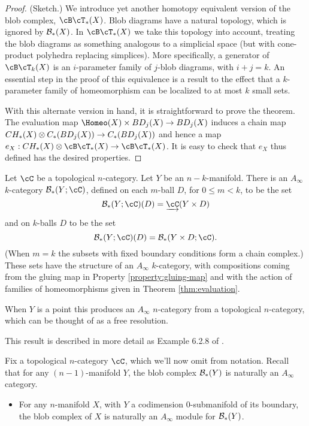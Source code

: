 \documentclass{pnastwo}
\begin{document}
\begin{article}
\begin{proof}(Sketch.)
We introduce yet another homotopy equivalent version of
the blob complex, $\cB\cT_*(X)$.
Blob diagrams have a natural topology, which is ignored by ${\mathcal B}_*(X)$.
In $\cB\cT_*(X)$ we take this topology into account, treating the blob diagrams as something
analogous to a simplicial space (but with cone-product polyhedra replacing simplices).
More specifically, a generator of $\cB\cT_k(X)$ is an $i$-parameter family of $j$-blob diagrams, with $i+j=k$. An essential step in the proof of this equivalence is a result to the effect that a $k$-parameter family of homeomorphism can be localized to at most $k$ small sets.

With this alternate version in hand, it is straightforward to prove the theorem.
The evaluation map $\Homeo(X)\times BD_j(X)\to BD_j(X)$
induces a chain map $CH_*(X)\otimes C_*(BD_j(X))\to C_*(BD_j(X))$
and hence a map $e_X: \CH{X} \tensor \cB\cT_*(X) \to \cB\cT_*(X)$.
It is easy to check that $e_X$ thus defined has the desired properties.
\end{proof}

\begin{thm}
\label{thm:blobs-ainfty}
Let $\cC$ be  a topological $n$-category.
Let $Y$ be an $n{-}k$-manifold. 
There is an $A_\infty$ $k$-category $\bc_*(Y;\cC)$, defined on each $m$-ball $D$, for $0 \leq m < k$, 
to be the set $$\bc_*(Y;\cC)(D) = \cl{\cC}(Y \times D)$$ and on $k$-balls $D$ to be the set 
$$\bc_*(Y;\cC)(D) = \bc_*(Y \times D; \cC).$$ 
(When $m=k$ the subsets with fixed boundary conditions form a chain complex.) 
These sets have the structure of an $A_\infty$ $k$-category, with compositions coming from the gluing map in 
Property \ref{property:gluing-map} and with the action of families of homeomorphisms given in Theorem \ref{thm:evaluation}.
\end{thm}
\begin{rem}
When $Y$ is a point this produces an $A_\infty$ $n$-category from a topological $n$-category, 
which can be thought of as a free resolution.
\end{rem}
This result is described in more detail as Example 6.2.8 of \cite{1009.5025}.

Fix a topological $n$-category $\cC$, which we'll now omit from notation.
Recall that for any $(n-1)$-manifold $Y$, the blob complex ${\mathcal B}_*(Y)$ is naturally an $A_\infty$ category.

\begin{thm}
\label{thm:gluing}
\mbox{}%
\begin{itemize}
\item For any $n$-manifold $X$, with $Y$ a codimension $0$-submanifold of its boundary, the blob complex of $X$ is naturally an
$A_\infty$ module for ${\mathcal B}_*(Y)$.


\end{itemize}
\end{thm}
\end{article}
\end{document}
